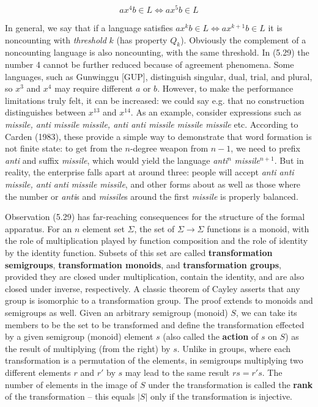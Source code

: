\begin{equation}
ax^4b \in L \Leftrightarrow ax^5b \in L
\end{equation}

\noindent In general, we say that if a language satisfies $ax^kb \in L
\Leftrightarrow ax^{k+1}b \in L$ it is noncounting with {\it threshold} $k$
(has property $Q_k$). Obviously the complement of a noncounting language is
also noncounting, with the same threshold.  In (5.29) the number 4 cannot be
further reduced because of agreement phenomena. Some languages, such as
Gunwinggu [GUP], distinguish singular, dual, trial, and plural, so $x^3$ and
$x^4$ may require different $a$ or $b$.  However, to make the performance
limitations truly felt, it can be increased: we could say e.g.  that no
construction distinguishes between $x^{13}$ and $x^{14}$. As an example,
consider expressions such as {\it missile, anti missile missile, anti anti
  missile missile missile} etc.  According to Carden (1983), these provide a
simple way to demonstrate that word formation is not finite state: to get from
the $n$-degree weapon from $n-1$, we need to prefix {\it anti} and suffix {\it
  missile}, which would yield the language {\it anti}$^n$ {\it
  missile}$^{n+1}$.  But in reality, the enterprise falls apart at around
three: people will accept {\it anti anti missile, anti anti missile missile},
and other forms about as well as those where the number or {\it anti}s and
{\it missile}s around the first {\it missile} is properly
balanced.\nocite{Carden:1983}

Observation (5.29) has far-reaching consequences for the structure of the
formal apparatus. For an $n$ element set $\Sigma$, the set of $\Sigma
\rightarrow \Sigma$ functions is a monoid, with the role of multiplication
played by function composition and the role of identity by the identity
function.  Subsets of this set are called {\bf transformation semigroups},
{\bf transformation monoids}, and {\bf transformation groups}, provided they
are closed under multiplication, contain the identity, and are also closed
under inverse, respectively. A
classic theorem of Cayley asserts that any group is isomorphic to a
transformation group. The proof extends to monoids and semigroups as well.
Given an arbitrary semigroup (monoid) $S$, we can take its members to be the
set to be transformed and define the transformation effected by a given
semigroup (monoid) element $s$ (also called the {\bf
  action} of $s$ on $S$) as the result of multiplying
(from the right) by $s$. Unlike in groups, where each transformation is a
permutation of the elements, in semigroups multiplying two different elements
$r$ and $r'$ by $s$ may lead to the same result $rs=r's$.  The number of
elements in the image of $S$ under the transformation is called the {\bf
  rank} of the transformation -- this equals $|S|$ only if
the transformation is injective.


